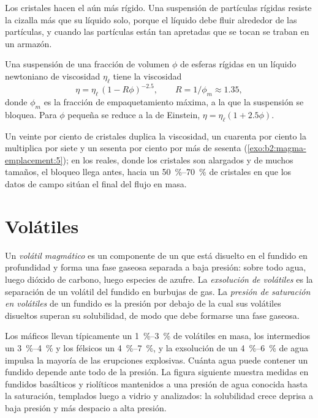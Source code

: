 Los cristales hacen el  aún más rígido. Una suspensión de partículas rígidas resiste
la cizalla más que su líquido solo, porque el líquido debe fluir alrededor de las
partículas, y cuando las partículas están tan apretadas que se tocan se traban en un
armazón.

\begin{proposition}\label{prop:b2:magma-emplacement:roscoe}
Una suspensión de una fracción de volumen $\phi$ de esferas rígidas en un líquido newtoniano
de viscosidad $\eta_{\ell}$ tiene la viscosidad
\[
\eta = \eta_{\ell}\,(1 - R\phi)^{-2.5}, \qquad R = 1/\phi_m \approx 1.35,
\]
donde $\phi_m$ es la fracción de empaquetamiento máxima, a la que la suspensión se bloquea. Para
$\phi$ pequeña se reduce a la de Einstein, $\eta = \eta_{\ell}(1 + 2.5\phi)$.
\end{proposition}
\admitted

Un veinte por ciento de cristales duplica la viscosidad, un cuarenta por ciento la multiplica por
siete y un sesenta por ciento por más de sesenta (\cref{exo:b2:magma-emplacement:5}); en los  reales, donde los
cristales son alargados y de muchos tamaños, el bloqueo llega antes, hacia un
\qtyrange{50}{70}{\percent} de cristales en que los datos de campo sitúan el
final del flujo en masa.

\section{Volátiles}

\begin{definition}\label{def:b2:magma-emplacement:volatiles}
Un \emph{volátil magmático} es un componente de un  que
está disuelto en el fundido en profundidad y forma una fase gaseosa separada a baja
presión: sobre todo agua, luego dióxido de carbono, luego especies de azufre. La \emph{exsolución
de volátiles} es la separación de un volátil del
fundido en burbujas de gas. La \emph{presión de saturación en
volátiles} de un fundido es la presión por debajo de la cual
sus volátiles disueltos superan su solubilidad, de modo que debe formarse una fase gaseosa.
\end{definition}

Los  máficos llevan típicamente un \qtyrange{1}{3}{\percent} de volátiles en masa,
los intermedios un \qtyrange{3}{4}{\percent} y los félsicos un
\qtyrange{4}{7}{\percent}, y la exsolución de un \qtyrange{4}{6}{\percent} de
agua impulsa la mayoría de las erupciones explosivas. Cuánta agua puede contener un fundido depende
ante todo de la presión. La figura siguiente muestra medidas en fundidos basálticos y
riolíticos mantenidos a una presión de agua conocida hasta la saturación, templados luego
a vidrio y analizados: la solubilidad crece deprisa a baja presión y más
despacio a alta presión.

